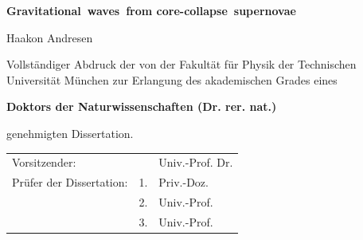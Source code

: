 \documentclass[a4paper,12pt,twoside]{scrbook}
\newcommand{\thesistitle}{\mbox{Gravitational waves from} \mbox{core-collapse supernovae}}
\newcommand{\titlenamefont}[1]{\Large{#1}}
\newcommand{\titledoktorfont}[1]{\textbf{\Large{#1}}}
\newcommand{\titletitlefont}[1]{\huge{\textbf{#1}}}
\begin{document}
\thispagestyle{empty}
\begin{center}

\bgroup
\tabcolsep=10mm
  \egroup

  \vspace*{1.8cm}

  \noindent

  \titletitlefont{\thesistitle}

  \vspace*{0.7cm}

  \noindent
  \titlenamefont{Haakon Andresen}

  \end{center}

  \vspace*{1cm}

  \noindent
  Vollst\"andiger Abdruck der von der Fakult\"at f\"ur Physik der Technischen
  Universit\"at M\"unchen zur Erlangung des akademischen Grades eines

  \begin{center}
  \titledoktorfont{Doktors der Naturwissenschaften (Dr. rer. nat.)}
  \end{center}

  \noindent
  genehmigten Dissertation.

  \vspace*{1cm}

  \begin{tabular}{lll}
  Vorsitzender: & & Univ.-Prof. Dr. \\
  Pr\"ufer der Dissertation: & 1. & Priv.-Doz.  \\
			     & 2. & Univ.-Prof.  \\
                             & 3. & Univ.-Prof. 
  \end{tabular}
\end{document}
